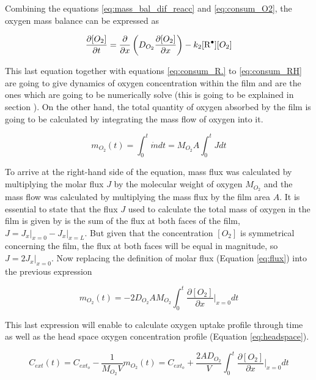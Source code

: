 \begin{refsection}
Combining the equations \ref{eq:mass_bal_dif_reacc} and \ref{eq:consum_O2}, the oxygen mass balance can be expressed as 

\begin{equation}
     \frac{\partial [O_2]}{\partial t}= \frac{\partial}{\partial x} \left(D_{O_2}\frac{\partial [O_2] }{\partial x}\right) -k_2[\ce{R^.}][O_2]
    \label{eq:mass_bal_def}
\end{equation}

This last equation together with equations \ref{eq:consum_R.} to \ref{eq:consum_RH} are going to give dynamics of oxygen concentration within the film and are the ones which are going to be numerically solve (this is going to be explained in section ). On the other hand, the total quantity of oxygen absorbed by the film is going to be calculated by integrating the mass flow of oxygen into it.

\begin{equation}
    m_{O_2}(t)= \int_0^t \dot{m}dt =M_{O_2}A\int_0^t Jdt 
\end{equation}

To arrive at the right-hand side of the equation, mass flux was calculated by multiplying the molar flux $J$ by the molecular weight of oxygen $M_{O_2}$ and the mass flow was calculated by multiplying the mass flux by the film area $A$. It is essential to state that the flux $J$ used to calculate the total mass of oxygen in the film is given by is the sum of the flux at both faces of the film, $J= J_x\rvert_{x = 0} - J_x\rvert_{x = L}$. But given that the concentration $[O_2]$ is symmetrical concerning the film, the flux at both faces will be equal in magnitude, so $J=2J_x\rvert_{x = 0}$.  Now replacing the definition of molar flux (Equation \ref{eq:flux}) into the previous expression

\begin{equation}
    m_{O_2}(t) =-2D_{O_2}AM_{O_2}\int_0^t \frac{\partial [O_2]}{\partial x}\biggr\rvert_{x = 0}dt
    \label{eq:total_mass_O2}
\end{equation}

This last expression will enable to calculate oxygen uptake profile through time as well as the head space oxygen concentration profile (Equation \ref{eq:headspace}). 

\begin{equation}
    C_{ext}(t)= C_{ext_o} - \frac{1}{M_{O_2}V} m_{O_2}(t)= C_{ext_o} + \frac{2AD_{O_2}}{V} \int_0^t \frac{\partial [O_2]}{\partial x}\biggr\rvert_{x = 0}dt
    \label{eq:headspace}
\end{equation}


\end{refsection}

